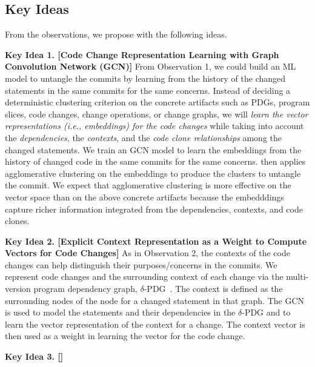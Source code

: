 \subsection{Key Ideas}
\label{ideas:sec}

From the observations, we propose {\tool} with the following ideas.

{\bf Key Idea 1. [Code Change Representation Learning with Graph
    Convolution Network (GCN)]} From Observation 1, we could build an
ML model to untangle the commits by learning from the history of the
changed statements in the same commits for the same concerns. Instead
of deciding a deterministic clustering criterion on the concrete
artifacts such as PDGs, program slices, code changes, change
operations, or change graphs, we will {\em learn the vector
  representations (i.e., embeddings) for the code changes} while
taking into account the {\em dependencies}, the {\em contexts}, and
the {\em code clone relationships} among the changed statements. We
train an GCN model to learn the embeddings from the history of changed
code in the same commits for the same concerns. {\tool} then applies
agglomerative clustering on the embeddings to produce the clusters to
untangle the commit. We expect that agglomerative clustering is more
effective on the vector space than on the above concrete artifacts
because the embedddings capture richer information integrated from the
dependencies, contexts, and code clones.


{\bf Key Idea 2. [Explicit Context Representation as a Weight to
    Compute Vectors for Code Changes]} As in Observation 2, the
contexts of the code changes can help distinguish their
purposes/concerns in the commits. We represent code changes and the
surrounding context of each change via the multi-version program
dependency graph, $\delta$-PDG~\cite{flexeme-fse20}. The context is
defined as the surrounding nodes of the node for a changed statement
in that graph. The GCN is used to model the statements and their
dependencies in the $\delta$-PDG and to learn the vector
representation of the context for a change. The context vector is then
used as a weight in learning the vector for the code change.

{\bf Key Idea 3. []} 

